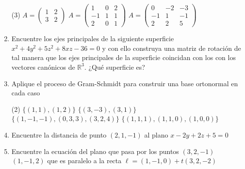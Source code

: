 \documentclass[letterpaper,11pt]{article}
\begin{document}
\begin{enumerate}
\begin{tasks}(3)
\task $A = \begin{pmatrix} 1 & 2 \\ 3 & 2 \end{pmatrix}$
\task $A = \begin{pmatrix} 1 & 0 & 2 \\ -1 & 1 & 1 \\ 2 & 0 & 1 \end{pmatrix}$
\task $A = \begin{pmatrix} 0 & -2 & -3 \\ -1 & 1 & -1 \\ 2 & 2 & 5 \end{pmatrix}$
\end{tasks}


\item Encuentre los ejes principales de la siguiente superficie $x^2 + 4y^2 + 5z^2 + 8xz - 36 = 0$ y con ello construya una matriz de rotación de tal manera que los ejes principales de la superficie coincidan con los con los vectores canónicos de $\mathbb{R}^3$. ¿Qué superficie es?   

\item Aplique el proceso de Gram-Schmidt para construir una base ortonormal en cada caso

\begin{tasks}(2)
\task  $\lbrace (1,1), (1,2) \rbrace$
\task $\lbrace (3,-3), (3,1) \rbrace$
\task $\lbrace (1,-1,-1), (0,3,3), (3,2,4) \rbrace$
\task $\lbrace (1,1,1), (1,1,0), (1,0,0) \rbrace$
\end{tasks}

\item Encuentre la distancia de punto $(2,1,-1)$ al plano $x -2y + 2z + 5 = 0$

\item Encuentre la ecuación del plano que pasa por los puntos $(3,2,-1)$ $(1,-1,2)$ que es paralelo a la recta $\ell = (1,-1,0) + t(3,2,-2)$

\end{enumerate}
\end{document}
